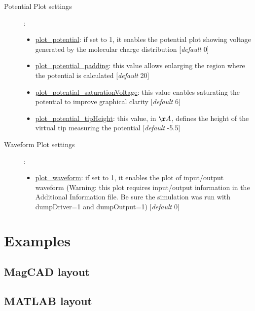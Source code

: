 \documentclass[a4paper,10pt]{article}
\begin{document}
\begin{description}
\item[Potential Plot settings]:
\begin{itemize}
	\item \underline{plot\_potential}: if set to 1, it enables the potential plot showing voltage generated by the molecular charge distribution [\textit{default} 0]
	\item \underline{plot\_potential\_padding}: this value allows enlarging the region where the potential is calculated [\textit{default} 20]
	\item \underline{plot\_potential\_saturationVoltage}: this value enables saturating the potential to improve graphical clarity [\textit{default} 6]
	\item \underline{plot\_potential\_tipHeight}: this value, in $\AA$, defines the height of the virtual tip measuring the potential [\textit{default} -5.5]
\end{itemize}
\item[Waveform Plot settings]:
\begin{itemize}
	\item \underline{plot\_waveform}: if set to 1, it enables the plot of input/output waveform (Warning: this plot requires input/output information in the Additional Information file. Be sure the simulation was run with dumpDriver=1 and dumpOutput=1) [\textit{default} 0]	
\end{itemize}


\end{description}

\section{Examples}
\subsection{MagCAD layout}


\subsection{MATLAB layout}

\end{document}
